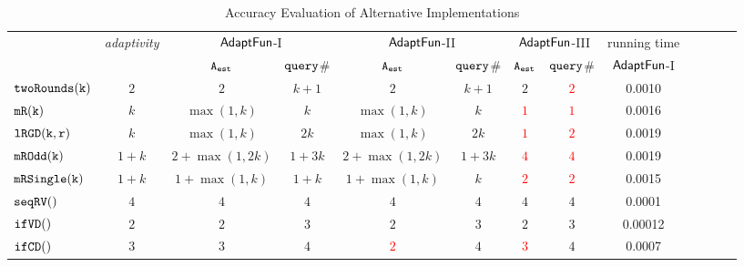 {\scriptsize
\begin {table}[t]
\vspace{-0.5cm}
    \caption{Accuracy Evaluation of {\THESYSTEM}  Alternative Implementations}
    \vspace{-0.3cm}
        \label{tb:adapt-imp-alternatives}
        \begin{center}
        \centering
{\scriptsize
        \begin{tabular}{ | >{\tiny}l | c | c | c | c | c | c | c | c | c | c | c |c}
        \hline \hline
        \multirow{2}{*}{Program $c$}
        &\multirow{2}{*}{\emph{adaptivity}}
         & \multicolumn{2}{c|}{$\textsf{AdaptFun}$-I}
         & \multicolumn{2}{c|}{$\textsf{AdaptFun}$-II}
         & \multicolumn{2}{c|}{$\textsf{AdaptFun}$-III}
         & {running time} \\ 
         \cline{3-9}
        & & {${\mathtt{A_{est}}}$ } & {${\tt query}$\# } & {${\mathtt{A_{est}}}$ } & {${\tt query}$\# } & {${\mathtt{A_{est}}}$ } & {${\tt query}$\# } & $\textsf{AdaptFun}$-I \\
         \cline{6-9}
         \hline \hline
         $  \mathtt{twoRounds(k)}$ &  $2$  &  $2$    & $k+1 $  & $2$ & $k + 1$ & $2$ & \textcolor{red}{$2$} & 0.0010   \\
         $  \mathtt{mR(k)}$ &  $k$ &   $\max(1,k)$ & $k$  &  $\max(1,k)$ & $k$ & \textcolor{red}{$1$} & \textcolor{red}{$1$} & 0.0016 \\
         $  \mathtt{lRGD(k, r)}$ &  $k$ & $\max(1,k) $ & $ 2k $  &  $\max(1,k) $ & $ 2k $ & \textcolor{red}{$1$} & \textcolor{red}{$2$} & 0.0019   \\
         $  \mathtt{mROdd(k)}$  &  $1+k$ &  $2+\max(1,2k)  $ & $1 + 3 k $  &  $2+\max(1,2k)  $ & $1 + 3 k $  & \textcolor{red}{$4$} & \textcolor{red}{$4$} & 0.0019 \\
         $  \mathtt{mRSingle(k)}$  &  $1+k$   & $1+ \max(1, k) $ & $1 + k$  &  $1+ \max(1, k) $ & $k$ & \textcolor{red}{$2$} & \textcolor{red}{$2$} & 0.0015  \\
         $  \mathtt{seqRV()}$  &  $4$  & $4$ &   $4$  & $4$ & $4$ & $4$ & $4$ & 0.0001 \\
         $  \mathtt{ifVD()}$  &  $2$  & $2$ &   $3$  & $2$ & $3$ & $2$ & $3$ & 0.00012 \\
         $  \mathtt{ifCD()}$  &  $3$  & $3$ &   $4$  & \textcolor{red}{$2$} & $4$ & \textcolor{red}{$3$} & $4$ & 0.0007 \\

\end{tabular}}
\end{center}
\end{table}}
